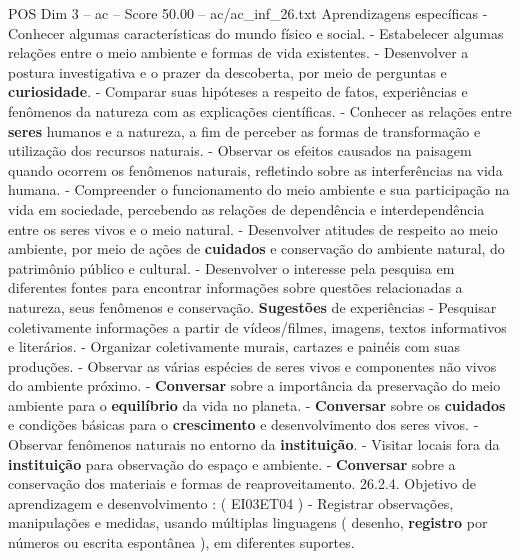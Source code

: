 \begin{textsample}{POS Dim 3 – ac – Score 50.00 – ac/ac\_inf\_26.txt}
Aprendizagens específicas - Conhecer algumas características do mundo físico e social. - Estabelecer algumas relações entre o meio ambiente e formas de vida existentes. - Desenvolver a postura investigativa e o prazer da descoberta, por meio de perguntas e \textbf{curiosidade}. - Comparar suas hipóteses a respeito de fatos, experiências e fenômenos da natureza com as explicações científicas. - Conhecer as relações entre \textbf{seres} humanos e a natureza, a fim de perceber as formas de transformação e utilização dos recursos naturais. - Observar os efeitos causados na paisagem quando ocorrem os fenômenos naturais, refletindo sobre as interferências na vida humana. - Compreender o funcionamento do meio ambiente e sua participação na vida em sociedade, percebendo as relações de dependência e interdependência entre os seres vivos e o meio natural. - Desenvolver atitudes de respeito ao meio ambiente, por meio de ações de \textbf{cuidados} e conservação do ambiente natural, do patrimônio público e cultural. - Desenvolver o interesse pela pesquisa em diferentes fontes para encontrar informações sobre questões relacionadas a natureza, seus fenômenos e conservação. \textbf{Sugestões} de experiências - Pesquisar coletivamente informações a partir de vídeos/filmes, imagens, textos informativos e literários. - Organizar coletivamente murais, cartazes e painéis com suas produções. - Observar as várias espécies de seres vivos e componentes não vivos do ambiente próximo. - \textbf{Conversar} sobre a importância da preservação do meio ambiente para o \textbf{equilíbrio} da vida no planeta. - \textbf{Conversar} sobre os \textbf{cuidados} e condições básicas para o \textbf{crescimento} e desenvolvimento dos seres vivos. - Observar fenômenos naturais no entorno da \textbf{instituição}. - Visitar locais fora da \textbf{instituição} para observação do espaço e ambiente. - \textbf{Conversar} sobre a conservação dos materiais e formas de reaproveitamento. 26.2.4.
Objetivo de aprendizagem e desenvolvimento : ( EI03ET04 ) - Registrar observações, manipulações e medidas, usando múltiplas linguagens ( desenho, \textbf{registro} por números ou escrita espontânea ), em diferentes suportes.

\end{textsample}
